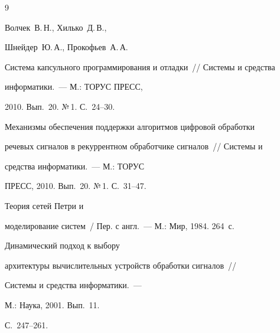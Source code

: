 {{\begin{thebibliography}{9}
{Волчек~В.\,Н., Хилько~Д.\,В., 


Шнейдер~Ю.\,А., Прокофьев~А.\,А.}


Система капсульного программирования и отладки~/\!\!/ Системы и средства 


информатики.~--- М.: ТОРУС ПРЕСС, 


2010. Вып.~20. №\,1. С.~24--30.









Механизмы обеспечения поддержки алгоритмов цифровой обработки 


речевых сигналов в рекуррентном обработчике сигналов~/\!\!/ Системы и 


средства информатики.~--- М.: ТОРУС 


ПРЕСС, 2010. Вып.~20. №\,1. С.~31--47.




 Теория сетей Петри и 


моделирование систем~/ Пер. с англ.~--- М.: Мир, 1984. 264~с.





    \label{end\stat}


    






Динамический подход к выбору 


архитектуры вычислительных устройств обработки сигналов~/\!\!/ 


Системы и средства информатики.~--- 


М.: Наука, 2001. Вып.~11. 


С.~247--261. 


 \end{thebibliography}


}


}


